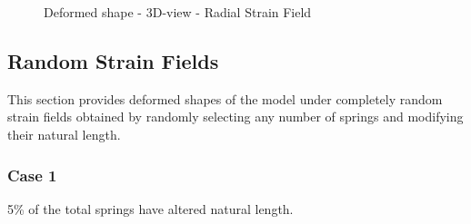 \begin{figure}[!htbp]
\begin{minipage}{0.3\textwidth}
    \caption{Deformed shape - 3D-view - Radial Strain Field}
    \label{fig:radial_strain_3d}
\end{minipage}
\end{figure}

\newpage
\subsection{Random Strain Fields}
This section provides deformed shapes of the model under completely random strain fields obtained by randomly selecting any number of springs and modifying their natural length.

\subsubsection{Case 1}
5\% of the total springs have altered natural length.
